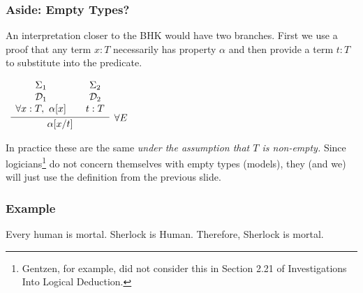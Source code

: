\documentclass{beamer}
\theoremstyle{indentDefn} \newtheorem{defn}[]{Definition}
\begin{document}
\begin{frame}
	\frametitle{Aside: Empty Types?}

	An interpretation closer to the BHK would have two branches. First we use a proof that any term $x : T$ necessarily has property $\alpha$ and then provide a term $t : T$ to substitute into the predicate.  

	\begin{center}
		$\begin{array}{c}
			\infer[\forall E]{\alpha[x/t]}
				{\begin{array}{c} 
					\Sigma_{1} \\
					\mathcal{D}_{1} \\ 
					\forall x : T, \ \alpha[x]	
					\end{array}
				&
				\begin{array}{c} 
					\Sigma_{2} \\
					\mathcal{D}_{2} \\ 
					t : T			
					\end{array}}
		\end{array}$
	\end{center}

	In practice these are the same \emph{under the assumption that $T$ is non-empty.} Since logicians\footnote{Gentzen, for example, did not consider this in Section 2.21 of Investigations Into Logical Deduction.} do not concern themselves with empty types (models), they (and we) will just use the definition from the previous slide. 

\end{frame}

\begin{frame}
	\frametitle{Example}
	
	Every human is mortal. Sherlock is Human. Therefore, Sherlock is mortal. 
	
	\vspace{60mm}
	
\end{frame}
\end{document}
